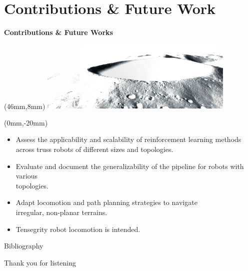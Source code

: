 \documentclass[11pt,aspectratio=169]{beamer}
\begin{document}
\section{Contributions \& Future Work}

\begin{frame}[fragile]{\textbf{Contributions \& Future Works}}


    \begin{textblock*}{5cm}(46mm,8mm) %
    \includegraphics[height=34mm]{elements/[16]-Future.png}
    \end{textblock*}

    \begin{textblock*}{138mm}(0mm,-20mm)

    \vspace{2mm}

    \begin{itemize}
        \item Assess the applicability and scalability of reinforcement learning methods across truss robots of different sizes and topologies.
        \item Evaluate and document the generalizability of the pipeline for robots with various \\ topologies.
        \item Adapt locomotion and path planning strategies to navigate \\ irregular, non-planar terrains.
        \item Tensegrity robot locomotion is intended.
    \end{itemize}
    \end{textblock*}

    \vspace{10mm}

\end{frame}

\begin{frame}[allowframebreaks]{Bibliography}
    
    
\end{frame}

\begin{closingframe}
    \smallskip
    {\Large Thank you for listening}
    \medskip
    \vspace{10mm}
\end{closingframe}
\end{document}
